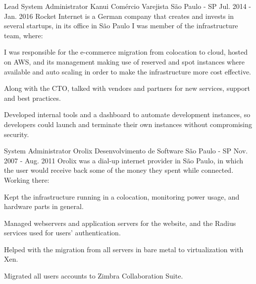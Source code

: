\begin{cventries}
    \cventry
    {Lead System Administrator} %
    {Kanui Comércio Varejista} %
    {São Paulo - SP} %
    {Jul. 2014 - Jan. 2016} %
    {
      Rocket Internet is a German company that creates and invests in several startups, in its office in São Paulo I was
      member of the infrastructure team, where:
    }
    {
      \begin{cvitems} %
            \item {I was responsible for the e-commerce migration from colocation to 
                  cloud, hosted on AWS, and its management making use of reserved 
                  and spot instances where available and auto scaling in order to 
                  make the infrastructure more cost effective.}
            \item {Along with the CTO, talked with vendors and partners for new 
                  services, support and best practices.}
            \item {Developed internal tools and a dashboard to automate development 
                  instances, so developers could launch and terminate their own 
                  instances without compromising security.}
      \end{cvitems}
    }

    \cventry
    {System Administrator} %
    {Orolix Desenvolvimento de Software} %
    {São Paulo - SP} %
    {Nov. 2007 - Aug. 2011} %
    {
      Orolix was a dial-up internet provider in São Paulo, in which the user would receive back some of the money they
      spent while connected. Working there:
    }
    {
      \begin{cvitems} %
            \item {Kept the infrastructure running in a colocation, monitoring power
                  usage, and hardware parts in general.}
            \item {Managed webservers and application servers for the website, and 
                  the Radius services used for users’ authentication.}
            \item {Helped with the migration from all servers in bare metal to 
                  virtualization with Xen.}
            \item {Migrated all users accounts to Zimbra Collaboration Suite.}
      \end{cvitems}
    }


\end{cventries}
